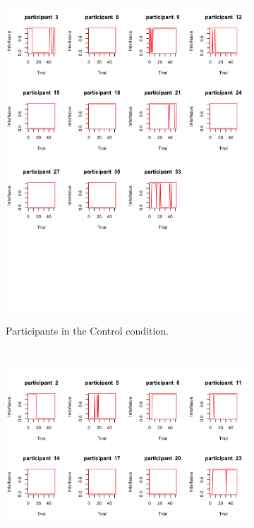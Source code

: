 \begin{figure}[!htbp]
    \centering
    \begin{subfigure}[b]{0.5\textwidth}
        \includegraphics[width=\textwidth]{images/ch34/ch34-4_plotControl(1).png}
        \includegraphics[width=\textwidth]{images/ch34/ch34-4_plotControl(2).png}
        \caption{Participants in the Control condition.}
    \end{subfigure}
    ~ %
    \begin{subfigure}[b]{0.5\textwidth}
        \includegraphics[width=\textwidth]{images/ch34/ch34-4_plotHigh-Am(1).png}

\end{subfigure}
\end{figure}
